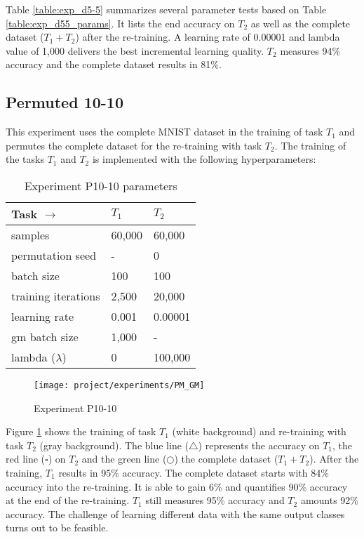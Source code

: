 Table \ref{table:exp_d5-5} summarizes several parameter tests based on Table \ref{table:exp_d55_params}.
It lists the end accuracy on $T_2$ as well as the complete dataset ($T_1 + T_2$) after the re-training.
\newline
A learning rate of 0.00001 and lambda value of 1,000 delivers the best incremental learning quality.
$T_2$ measures 94\% accuracy and the complete dataset results in 81\%.

\newpage

\subsection{Permuted 10-10}

This experiment uses the complete MNIST dataset in the training of task $T_1$ and permutes the complete dataset for the re-training with task $T_2$.
\newline
The training of the tasks $T_1$ and $T_2$ is implemented with the following hyperparameters:

\begin{table}[H]
    \centering
    \begin{tabular}{ |l|l|l| }
        \hline
        Task $\to$ & $T_1$ & $T_2$ \\
        \hline\hline
        samples & 60,000 & 60,000 \\
        \hline
        permutation seed & - & 0 \\
        \hline
        batch size & 100 & 100 \\
        \hline
        training iterations & 2,500 & 20,000 \\
        \hline
        learning rate & 0.001 & 0.00001 \\
        \hline
        \acrshort{gm} batch size & 1,000 & - \\
        \hline
        lambda ($\lambda$) & 0 & 100,000 \\
        \hline
    \end{tabular}
    \caption{Experiment P10-10 parameters}
    \label{table:exp_p1010_params}
\end{table}

\begin{figure}[H]
    \centering
    \texttt{[image: project/experiments/PM\_GM]}
    \caption{Experiment P10-10}
    \label{fig:exp_p10-10}
\end{figure}

Figure \ref{fig:exp_p10-10} shows the training of task $T_1$ (white background) and re-training with task $T_2$ (gray background).
The blue line ($\triangle$) represents the accuracy on $T_1$, the red line ($\square$) on $T_2$ and the green line ($\bigcirc$) the complete dataset ($T_1 + T_2$).
After the training, $T_1$ results in 95\% accuracy.
The complete dataset starts with 84\% accuracy into the re-training.
It is able to gain 6\% and quantifies 90\% accuracy at the end of the re-training.
$T_1$ still measures 95\% accuracy and $T_2$ amounts 92\% accuracy.
\newline
The challenge of learning different data with the same output classes turns out to be feasible.

